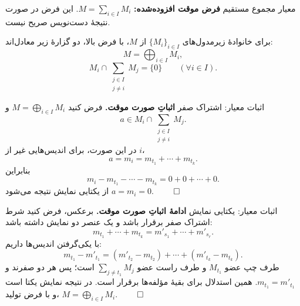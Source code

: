 \begin{frame}{معیار مجموع مستقیم}
    \label{lec04:direct-sum-criterion}
    \textbf{فرض موقت افزوده‌شده:} $M=\sum_{i\in I}M_i$.
    این فرض در صورت نتیجهٔ دست‌نویس صریح نیست. \lr{[L04-Q04]}

    \begin{corollary}
        برای خانوادهٔ زیرمدول‌های $\{M_i\}_{i\in I}$ از $M$، با فرض بالا،
        دو گزارهٔ زیر معادل‌اند:
        \[
            M=\bigoplus_{i\in I}M_i,
        \]
        \[
            M_i\cap\sum_{\substack{j\in I\\j\ne i}}M_j=\{0\}
            \qquad(\forall i\in I).
        \]
    \end{corollary}
\end{frame}

\begin{frame}{اثبات معیار: اشتراک صفر}
    \label{lec04:direct-sum-proof-intersection}
    \textbf{اثباتِ صورت موقت.} \lr{[L04-Q04]}
    فرض کنید $M=\bigoplus_{i\in I}M_i$ و
    \[
        a\in M_i\cap\sum_{\substack{j\in I\\j\ne i}}M_j.
    \]
    در این صورت، برای اندیس‌هایی غیر از $i$،
    \[
        a=m_i=m_{t_1}+\cdots+m_{t_k}.
    \]
    بنابراین
    \[
        m_i-m_{t_1}-\cdots-m_{t_k}=0+0+\cdots+0.
    \]
    از یکتایی نمایش نتیجه می‌شود $a=m_i=0$.
    \hfill$\qed$
\end{frame}

\begin{frame}{اثبات معیار: یکتایی نمایش}
    \label{lec04:direct-sum-proof-uniqueness}
    \textbf{ادامهٔ اثباتِ صورت موقت.} \lr{[L04-Q04]}
    برعکس، فرض کنید شرط اشتراک صفر برقرار باشد و یک عنصر دو نمایش داشته باشد:
    \[
        m_{t_1}+\cdots+m_{t_k}=m'_{s_1}+\cdots+m'_{s_r}.
    \]
    با یکی‌گرفتن اندیس‌ها داریم:
    \[
        m_{t_1}-m'_{t_1}
        =(m'_{t_2}-m_{t_2})+\cdots+(m'_{t_k}-m_{t_k}).
    \]
    طرف چپ عضو $M_{t_1}$ و طرف راست عضو
    $\sum_{j\ne t_1}M_j$ است؛ پس هر دو صفرند و
    $m_{t_1}=m'_{t_1}$. همین استدلال برای بقیهٔ مؤلفه‌ها برقرار است.
    در نتیجه نمایش یکتا است و با فرض تولید، $M=\bigoplus_{i\in I}M_i$.
    \hfill$\qed$
\end{frame}

